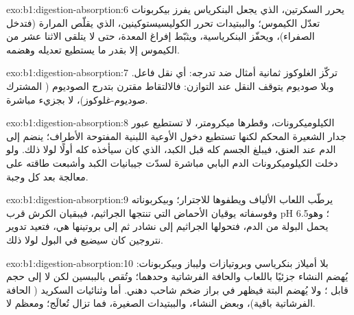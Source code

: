 \begin{solution}{exo:b1:digestion-absorption:6}
 يحرر السكرتين، الذي يجعل البنكرياس يفرز بيكربونات تعدّل
الكيموس؛  والببتيدات تحرر الكوليسيستوكينين، الذي يقلّص
المرارة (فتدخل الصفراء)، ويحفّز  البنكرياسية، ويثبّط
إفراغ المعدة، حتى لا يتلقى الاثنا عشر من الكيموس إلا بقدر ما
يستطيع تعديله وهضمه.
\end{solution}

\begin{solution}{exo:b1:digestion-absorption:7}
تركّز الغلوكوز ثمانية أمثال ضد تدرجه: أي نقل فاعل. وبلا صوديوم
يتوقف النقل عند التوازن: فالالتقاط مقترن بتدرج الصوديوم (
المشترك صوديوم-غلوكوز)، لا بجزيء  مباشرة.
\end{solution}

\begin{solution}{exo:b1:digestion-absorption:8}
الكيلوميكرونات، وقطرها ميكرومتر، لا تستطيع عبور جدار الشعيرة
المحكم لكنها تستطيع دخول الأوعية اللبنية المفتوحة الأطراف؛ 
ينضم إلى الدم عند العنق، فيبلغ  الجسم كله قبل الكبد، الذي
كان سيأخذه كله أولًا لولا ذلك. ولو دخلت الكيلوميكرونات الدم
البابي مباشرة لسدّت جيبانيات الكبد وأشبعت طاقته على معالجة 
بعد كل وجبة.
\end{solution}

\begin{solution}{exo:b1:digestion-absorption:9}
يرطّب اللعاب الألياف ويطفوها للاجترار؛ وبيكربوناته وفوسفاته
يوقيان الأحماض التي تنتجها الجراثيم، فيبقيان الكرش قرب pH 6.5؛
وهو يحمل البولة من الدم، فتحولها الجراثيم إلى نشادر ثم إلى
بروتينها هي، فتعيد تدوير نتروجين كان سيضيع في البول لولا ذلك.
\end{solution}

\begin{solution}{exo:b1:digestion-absorption:10}
بلا أميلاز بنكرياسي وبروتيازات وليباز وبيكربونات: يُهضم النشاء
جزئيًا باللعاب والحافة الفرشاتية وحدهما؛ وتُقص 
بالببسين لكن لا إلى حجم قابل ؛ ولا يُهضم  البتة
فيظهر في براز ضخم شاحب دهني. أما  وثنائيات السكريد
( الحافة الفرشاتية باقية)، وبعض النشاء، والببتيدات
الصغيرة، فما تزال تُعالَج؛  ومعظم  لا.
\end{solution}

